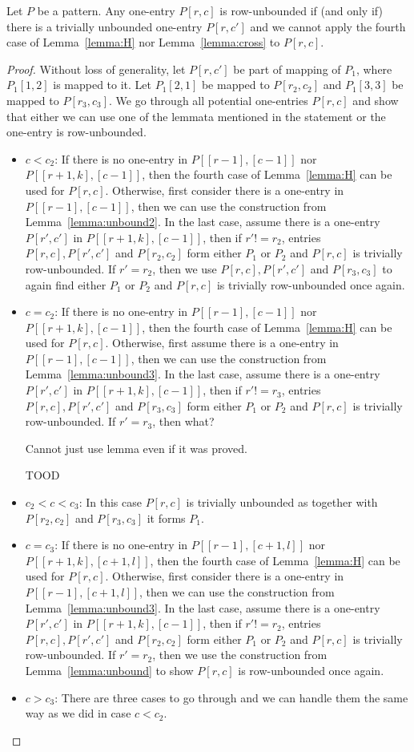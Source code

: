 \begin{thm}
Let $P$ be a pattern. Any one-entry $P[r,c]$ is row-unbounded if (and only if) there is a trivially unbounded one-entry $P[r,c']$ and we cannot apply the fourth case of Lemma~\ref{lemma:H} nor Lemma~\ref{lemma:cross} to $P[r,c]$.
\end{thm}
\begin{proof}
Without loss of generality, let $P[r,c']$ be part of mapping of $P_1$, where $P_1[1,2]$ is mapped to it. Let $P_1[2,1]$ be mapped to $P[r_2,c_2]$ and $P_1[3,3]$ be mapped to $P[r_3,c_3]$. We go through all potential one-entries $P[r,c]$ and show that either we can use one of the lemmata mentioned in the statement or the one-entry is row-unbounded.
\begin{itemize}
	\item $c<c_2$: If there is no one-entry in $P[[r-1],[c-1]]$ nor $P[[r+1,k],[c-1]]$, then the fourth case of Lemma~\ref{lemma:H} can be used for $P[r,c]$. Otherwise, first consider there is a one-entry in $P[[r-1],[c-1]]$, then we can use the construction from Lemma~\ref{lemma:unbound2}. In the last case, assume there is a one-entry $P[r',c']$ in $P[[r+1,k],[c-1]]$, then if $r'!=r_2$, entries $P[r,c],P[r',c']$ and $P[r_2,c_2]$ form either $P_1$ or $P_2$ and $P[r,c]$ is trivially row-unbounded. If $r'=r_2$, then we use $P[r,c],P[r',c']$ and $P[r_3,c_3]$ to again find either $P_1$ or $P_2$ and $P[r,c]$ is trivially row-unbounded once again.
	\item $c=c_2$: If there is no one-entry in $P[[r-1],[c-1]]$ nor $P[[r+1,k],[c-1]]$, then the fourth case of Lemma~\ref{lemma:H} can be used for $P[r,c]$. Otherwise, first assume there is a one-entry in $P[[r-1],[c-1]]$, then we can use the construction from Lemma~\ref{lemma:unbound3}. In the last case, assume there is a one-entry $P[r',c']$ in $P[[r+1,k],[c-1]]$, then if $r'!=r_3$, entries $P[r,c],P[r',c']$ and $P[r_3,c_3]$ form either $P_1$ or $P_2$ and $P[r,c]$ is trivially row-unbounded. If $r'=r_3$, then what?
	
	Cannot just use lemma even if it was proved.
	
	TOOD
	\item $c_2<c<c_3$: In this case $P[r,c]$ is trivially unbounded as together with $P[r_2,c_2]$ and $P[r_3,c_3]$ it forms $P_1$.
	\item $c=c_3$: If there is no one-entry in $P[[r-1],[c+1,l]]$ nor $P[[r+1,k],[c+1,l]]$, then the fourth case of Lemma~\ref{lemma:H} can be used for $P[r,c]$. Otherwise, first consider there is a one-entry in $P[[r-1],[c+1,l]]$, then we can use the construction from Lemma~\ref{lemma:unbound3}. In the last case, assume there is a one-entry $P[r',c']$ in $P[[r+1,k],[c-1]]$, then if $r'!=r_2$, entries $P[r,c],P[r',c']$ and $P[r_2,c_2]$ form either $P_1$ or $P_2$ and $P[r,c]$ is trivially row-unbounded. If $r'=r_2$, then we use the construction from Lemma~\ref{lemma:unbound} to show $P[r,c]$ is row-unbounded once again.
	\item $c>c_3$: There are three cases to go through and we can handle them the same way as we did in case $c<c_2$.
\end{itemize}
\end{proof}